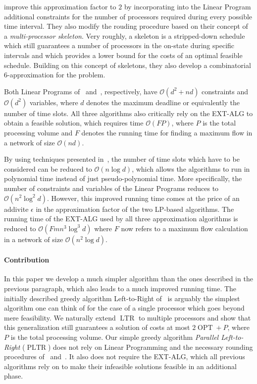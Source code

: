 \documentclass[a4paper]{article}
\DeclareMathOperator{\OPT}{OPT}
\DeclareMathOperator{\PLTR}{PLTR}
\DeclareMathOperator{\LTR}{LTR}
\begin{document}
\cite{skeletons} improve this approximation factor to $2$ by incorporating into the Linear Program additional constraints for the number of processors required during every possible time interval.
They also modify the rouding procedure based on their concept of a \textit{multi-processor skeleton}.
Very roughly, a skeleton is a stripped-down schedule which still guarantees a number of processors in the on-state during specific intervals and which provides a lower bound for the costs of an optimal feasible schedule.
Building on this concept of skeletons, they also develop a combinatorial $6$-approximation for the problem.

Both Linear Programs of~\cite{antoniadis} and~\cite{skeletons}, respectively, have $\mathcal{O}(d^2 + nd)$ constraints and $\mathcal{O}(d^2)$ variables, where $d$ denotes the maximum deadline or equivalently the number of time slots.
All three algorithms also critically rely on the EXT-ALG to obtain a feasible solution, which requires time $\mathcal{O}(FP)$, where $P$ is the total processing volume and $F$ denotes the running time for finding a maximum flow in a network of size $\mathcal{O}(nd)$.

By using techniques presented in~\cite{antoniadis}, the number of time slots which have to be considered can be reduced to $\mathcal{O}(n \log d)$, which allows the algorithms to run in polynomial time instead of just pseudo-polynomial time.
More specifically, the number of constraints and variables of the Linear Programs reduces to $\mathcal{O}(n^2 \log^2 d)$.
However, this improved running time comes at the price of an addivite $\epsilon$ in the approximation factor of the two LP-based algorithms.
The running time of the EXT-ALG used by all three approximation algorithms is reduced to $\mathcal{O}(F m n^3 \log^3 d)$ where $F$ now refers to a maximum flow calculation in a network of size $\mathcal{O}(n^2 \log d)$.

\paragraph{Contribution}
In this paper we develop a much simpler algorithm than the ones described in the previous paragraph, which also leads to a much improved running time.
The initially described greedy algorithm Left-to-Right of~\cite{irani_left_to_right_soda_2003} is arguably the simplest algorithm one can think of for the case of a single processor which goes beyond mere feasibility.
We naturally extend $\LTR$ to multiple processors and show that this generalization still guarantees a solution of costs at most $2 \OPT + P$, where $P$ is the total processing volume.
Our simple greedy algorithm \textit{Parallel Left-to-Right} ($\PLTR$) does not rely on Linear Programming and the necessary rounding procedures of~\cite{antoniadis} and~\cite{skeletons}.
It also does not require the EXT-ALG, which all previous algorithms rely on to make their infeasible solutions feasible in an additional phase.
\end{document}
